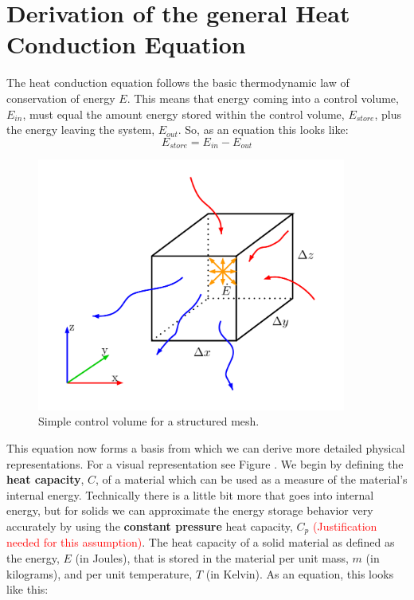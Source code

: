 \documentclass[11pt,letterpaper,titlepage]{article}
\begin{document}
\pagestyle{fancy}
\cfoot{}
\lfoot{\truncate{14cm}{\NSCDOCTITLE}}
\rhead{}
\chead{\currentname}
\lhead{}
\renewcommand{\footrulewidth}{0.4pt}
\tableofcontents
{}

\listoffigures
\listoftables
{}


\newpage
{}
\section{Derivation of the general Heat Conduction Equation}
The heat conduction equation follows the basic thermodynamic law of conservation of energy $E$. This means that energy coming into a control volume, $E_{in}$, must equal the amount energy stored within the control volume, $E_{store}$, plus the energy leaving the system, $E_{out}$. So, as an equation this looks like:
$$
	 E_{store} = E_{in}-E_{out}
$$
\begin{center}
	\begin{minipage}[c]{0.6\textwidth}

		\begin{figure}[H]
		
			\includegraphics[width=4.0in]{FiniteCube.png}
			\caption{Simple control volume for a structured mesh.}
			\label{figure:SimpleControlVolume}
		\end{figure}
	\end{minipage}
\end{center}
\bigskip
This equation now forms a basis from which we can derive more detailed physical representations. For a visual representation see Figure . We begin by defining the \textbf{heat capacity}, $C$, of a material which can be used as a measure of the material's internal energy. Technically there is a little bit more that goes into internal energy, but for solids we can approximate the energy storage behavior very accurately by using the \textbf{constant pressure} heat capacity, $C_p$ \textcolor{red}{(Justification needed for this assumption)}. The heat capacity of a solid material as defined as the energy, $E$ (in Joules), that is stored in the material per unit mass, $m$ (in kilograms), and per unit temperature, $T$ (in Kelvin). As an equation, this looks like this:
\end{document}
